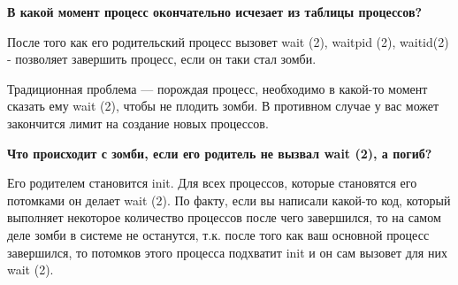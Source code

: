 \textbf{В какой момент процесс окончательно исчезает из таблицы процессов?}

После того как его родительский процесс вызовет wait (2), waitpid (2), waitid(2) - позволяет завершить процесс, если он таки стал зомби. 

Традиционная проблема --- порождая процесс, необходимо в какой-то момент сказать ему wait (2), чтобы не плодить зомби. В противном случае у вас может закончится лимит на создание новых процессов. 

\textbf{Что происходит с зомби, если его родитель не вызвал wait (2), а погиб?}

Его родителем становится init. Для всех процессов, которые становятся его потомками он делает wait (2). По факту, если вы написали какой-то код, который выполняет некоторое количество процессов после чего завершился, то на самом деле зомби в системе не останутся, т.к. после того как ваш основной процесс завершился, то потомков этого процесса подхватит init и он сам вызовет для них wait (2).